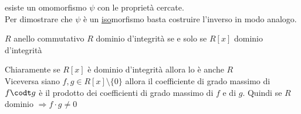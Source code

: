 \documentclass[12px]{article}
\begin{document}
esiste un omomorfismo $\psi$ con le proprietà cercate.\\
Per dimostrare che $\psi$ è un \underline{iso}morfismo basta costruire l'inverso in modo analogo.
\begin{prop}
	$R$ anello commutativo $R$ dominio d'integrità se e solo se $R[x]$ dominio d'integrità
\end{prop}
\begin{dimo}
	Chiaramente se $R[x]$ è dominio d'integrità allora lo è anche  $R$\\
	Viceversa siano $f,g\in R[x] \setminus\{0\}$ allora il coefficiente di grado massimo di $f\codt g$ è il prodotto dei coefficienti di grado massimo di $f$ e di $g$. Quindi se $R$ dominio $ \Rightarrow f\cdot g\neq 0$

\end{dimo}
\newpage
\end{document}
